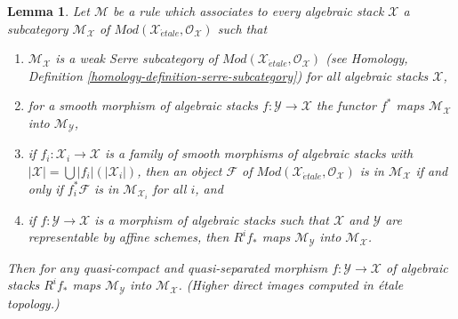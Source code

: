 \documentclass{stacks-project}
\theoremstyle{plain}
\newtheorem{lemma}[subsection]{Lemma}
\theoremstyle{definition}
\theoremstyle{remark}
\numberwithin{equation}{subsection}
\def\etale{{\acute{e}tale}}
\begin{document}
\begin{lemma}
\label{lemma-general-pushforward}
Let $\mathcal{M}$ be a rule which associates to every algebraic stack
$\mathcal{X}$ a subcategory $\mathcal{M}_\mathcal{X}$ of
$\textit{Mod}(\mathcal{X}_\etale, \mathcal{O}_\mathcal{X})$
such that
\begin{enumerate}
\item $\mathcal{M}_\mathcal{X}$ is a weak Serre subcategory
of $\textit{Mod}(\mathcal{X}_\etale, \mathcal{O}_\mathcal{X})$
(see Homology, Definition \ref{homology-definition-serre-subcategory})
for all algebraic stacks $\mathcal{X}$,
\item for a smooth morphism of algebraic stacks
$f : \mathcal{Y} \to \mathcal{X}$ the functor $f^*$ maps
$\mathcal{M}_\mathcal{X}$ into $\mathcal{M}_\mathcal{Y}$,
\item if $f_i : \mathcal{X}_i \to \mathcal{X}$ is a family of smooth
morphisms of algebraic stacks with
$|\mathcal{X}| = \bigcup |f_i|(|\mathcal{X}_i|)$, then an object
$\mathcal{F}$ of
$\textit{Mod}(\mathcal{X}_\etale, \mathcal{O}_\mathcal{X})$
is in $\mathcal{M}_\mathcal{X}$ if and only if
$f_i^*\mathcal{F}$ is in $\mathcal{M}_{\mathcal{X}_i}$ for all $i$, and
\item if $f : \mathcal{Y} \to \mathcal{X}$ is a morphism of algebraic
stacks such that $\mathcal{X}$ and $\mathcal{Y}$ are representable
by affine schemes, then $R^if_*$ maps $\mathcal{M}_\mathcal{Y}$
into $\mathcal{M}_\mathcal{X}$.
\end{enumerate}
Then for any quasi-compact and quasi-separated morphism 
$f : \mathcal{Y} \to \mathcal{X}$ of algebraic stacks
$R^if_*$ maps $\mathcal{M}_\mathcal{Y}$
into $\mathcal{M}_\mathcal{X}$. (Higher direct images computed in \'etale
topology.)
\end{lemma}
\end{document}
